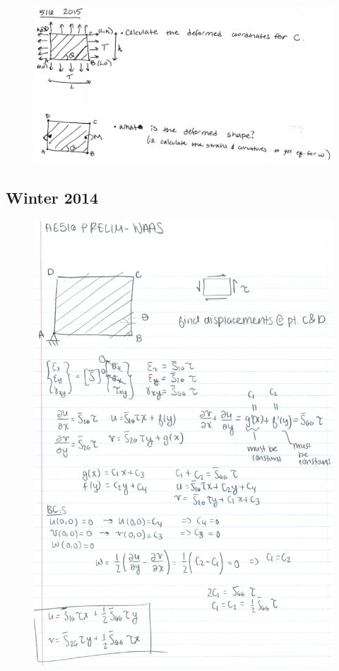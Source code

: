 \documentclass[11pt]{article}
\begin{document}
    \begin{figure}[H]
        \includegraphics[width=16cm]{516_2015}\centering
        \label{fig:3}
    \end{figure}

    \subsection{Winter 2014}

    \begin{figure}[H]
        \includegraphics[width=16cm]{516_2014}\centering
        \label{fig:4}
    \end{figure}
\end{document}
